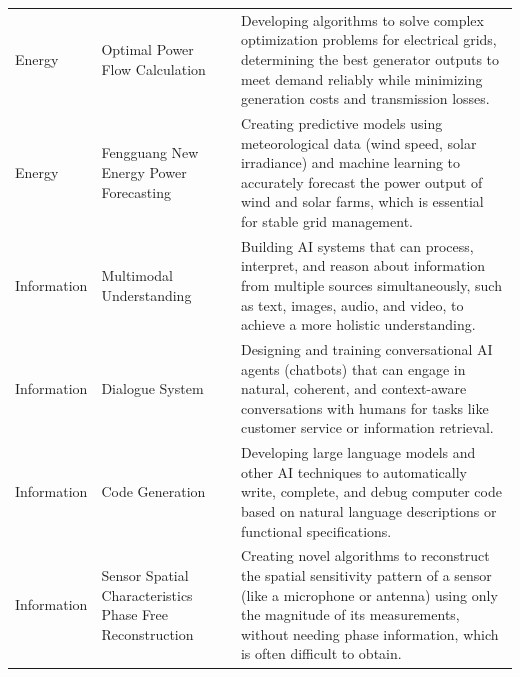 \begin{longtable}{p{2cm}p{6cm}p{7cm}}
\rowcolor{EnergyColor} Energy & Optimal Power Flow Calculation & Developing algorithms to solve complex optimization problems for electrical grids, determining the best generator outputs to meet demand reliably while minimizing generation costs and transmission losses. \\
\rowcolor{EnergyColor} Energy & Fengguang New Energy Power Forecasting & Creating predictive models using meteorological data (wind speed, solar irradiance) and machine learning to accurately forecast the power output of wind and solar farms, which is essential for stable grid management. \\

\rowcolor{InfoColor} Information & Multimodal Understanding & Building AI systems that can process, interpret, and reason about information from multiple sources simultaneously, such as text, images, audio, and video, to achieve a more holistic understanding. \\
\rowcolor{InfoColor} Information & Dialogue System & Designing and training conversational AI agents (chatbots) that can engage in natural, coherent, and context-aware conversations with humans for tasks like customer service or information retrieval. \\
\rowcolor{InfoColor} Information & Code Generation & Developing large language models and other AI techniques to automatically write, complete, and debug computer code based on natural language descriptions or functional specifications. \\
\rowcolor{InfoColor} Information & Sensor Spatial Characteristics Phase Free Reconstruction & Creating novel algorithms to reconstruct the spatial sensitivity pattern of a sensor (like a microphone or antenna) using only the magnitude of its measurements, without needing phase information, which is often difficult to obtain. \\


\end{longtable}
